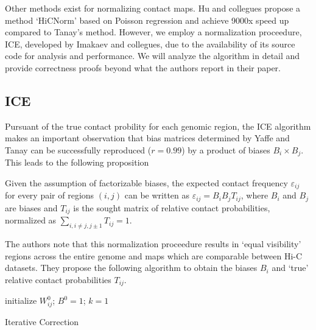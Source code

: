 Other methods exist for normalizing contact maps.  Hu and collegues propose a method `HiCNorm' based on Poisson regression and achieve
9000x speed up compared to Tanay's method\cite{hu2012}.  However, we employ a normalization proceedure, \gls{ICE}, developed by Imakaev
and collegues, due to the availability of its source code for analysis and performance\cite{imakaev2012}.   We will analyze the
algorithm in detail and provide correctness proofs beyond what the authors report in their paper\cite{imakaev2012}.

\subsection*{\gls{ICE}}

Pursuant of the true contact probility for each genomic region, the \gls{ICE} algorithm makes an important observation that bias matrices
determined by Yaffe and Tanay\cite{yaffe2011} can be successfully reproduced ($r = 0.99$) by a product of biases $B_i \times B_j$.  This
leads to the following proposition

\begin{prop}
  Given the assumption of factorizable biases, the expected contact frequency $\varepsilon_{ij}$ for every pair of regions $(i,j)$ can
  be written as $\varepsilon_{ij} = B_{i}B_{j}T_{ij}$, where $B_i$ and $B_j$ are biases and $T_{ij}$ is the sought matrix of relative contact
  probabilities, normalized as $\sum_{i, i \neq j, j \pm 1}T_{ij} = 1$.
\end{prop}

The authors note that this normalization proceedure results in `equal visibility' regions across the entire genome and maps which are
comparable between Hi-C datasets.  They propose the following algorithm to obtain the biases $B_i$ and `true' relative contact probabilities
$T_{ij}$.

\begin{algorithm}[H]
  initialize $W^{0}_{ij}$; $B^0 = 1$; $k = 1$\;
  \caption{Iterative Correction}
\end{algorithm}


